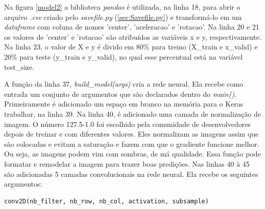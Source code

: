Na figura \ref{model2} a biblioteca \textit{pandas} é utilizada, na linha 18,  para abrir o arquivo \textit{.csv} criado pelo \textit{savefile.py} (\ref{sec:Savefile.py}) e transformá-lo em um \textit{dataframe} com coluna de nomes 'center', 'aceleracao' e 'rotacao'.
Na linha 20 e 21 os valores de 'center' e 'rotacao' são atribuídos as variáveis x e y, respectivamente. Na linha 23, o valor de X e y é divido em 80\% para treino (X\_train e x\_valid) e 20\% para teste (y\_train e y\_valid), no qual esse percentual está na variável test\_size.

	\begin{figure}[H]
		\centering
\end{figure}
A função da linha 37, \textit{build\_model(args)} cria a rede neural. Ela recebe como entrada um conjunto de argumentos que são declarados dentro do \textit{main()}.
Primeiramente é adicionado um espaço em branco na memória para o Keras trabalhar, na linha 39. 
Na linha 40, é adicionado uma camada de normalização de imagem. O número 127.5-1.0 foi escolhido pela comunidade de desenvolvedores depois de treinar e com diferentes valores. Eles normalizam as imagens assim que são colocadas e evitam a saturação e fazem com que o gradiente funcione melhor. Ou seja, as imagens podem vim com sombras, de má qualidade. Essa função pode formatar e remodelar a imagem para trazer boas predições.
Nas linhas 40 à 45 são adicionadas 5 camadas convolucionais na rede neural. Ela recebe os seguintes argumentos: 

\begin{lstlisting}
conv2D(nb_filter, nb_row, nb_col, activation, subsample)
\end{lstlisting}

